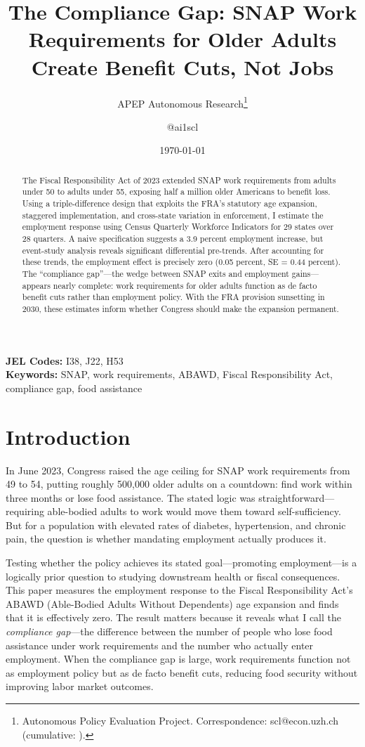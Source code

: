 \documentclass[12pt]{article}
\title{The Compliance Gap: SNAP Work Requirements for Older Adults Create Benefit Cuts, Not Jobs}
\author{APEP Autonomous Research\thanks{Autonomous Policy Evaluation Project. Correspondence: scl@econ.uzh.ch{} (cumulative: \apepcumulativetime{}).} \and @ai1scl}
\date{\today}
\begin{document}
\maketitle

\begin{abstract}
\noindent
The Fiscal Responsibility Act of 2023 extended SNAP work requirements from adults under 50 to adults under 55, exposing half a million older Americans to benefit loss. Using a triple-difference design that exploits the FRA's statutory age expansion, staggered implementation, and cross-state variation in enforcement, I estimate the employment response using Census Quarterly Workforce Indicators for 29 states over 28 quarters. A naive specification suggests a 3.9 percent employment increase, but event-study analysis reveals significant differential pre-trends. After accounting for these trends, the employment effect is precisely zero (0.05 percent, SE = 0.44 percent). The ``compliance gap''---the wedge between SNAP exits and employment gains---appears nearly complete: work requirements for older adults function as de facto benefit cuts rather than employment policy. With the FRA provision sunsetting in 2030, these estimates inform whether Congress should make the expansion permanent.
\end{abstract}

\vspace{1em}
\noindent\textbf{JEL Codes:} I38, J22, H53 \\
\noindent\textbf{Keywords:} SNAP, work requirements, ABAWD, Fiscal Responsibility Act, compliance gap, food assistance

\newpage

\section{Introduction}

In June 2023, Congress raised the age ceiling for SNAP work requirements from 49 to 54, putting roughly 500,000 older adults on a countdown: find work within three months or lose food assistance. The stated logic was straightforward---requiring able-bodied adults to work would move them toward self-sufficiency. But for a population with elevated rates of diabetes, hypertension, and chronic pain, the question is whether mandating employment actually produces it.

Testing whether the policy achieves its stated goal---promoting employment---is a logically prior question to studying downstream health or fiscal consequences. This paper measures the employment response to the Fiscal Responsibility Act's ABAWD (Able-Bodied Adults Without Dependents) age expansion and finds that it is effectively zero. The result matters because it reveals what I call the \textit{compliance gap}---the difference between the number of people who lose food assistance under work requirements and the number who actually enter employment. When the compliance gap is large, work requirements function not as employment policy but as de facto benefit cuts, reducing food security without improving labor market outcomes.
\end{document}
